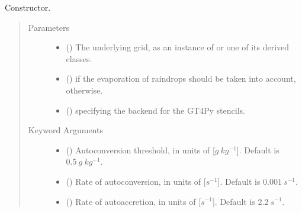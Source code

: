 \documentclass[letterpaper,10pt,english]{sphinxmanual}
\begin{document}
\begin{fulllineitems}
\begin{fulllineitems}
\label{\detokenize{api:parameterizations.adjustment_microphysics_kessler_wrf.AdjustmentMicrophysicsKesslerWRF.__init__}}
Constructor.
\begin{quote}\begin{description}
\item[{Parameters}] \leavevmode\begin{itemize}
\item {} 
 () \textendash{} The underlying grid, as an instance of {\hyperref[\detokenize{api:grids.grid_xyz.GridXYZ}]{}} or one of its derived classes.

\item {} 
 () \textendash{}  if the evaporation of raindrops should be taken into account,  otherwise.

\item {} 
 () \textendash{}  specifying the backend for the GT4Py stencils.

\end{itemize}

\item[{Keyword Arguments}] \leavevmode\begin{itemize}
\item {} 
 () \textendash{} Autoconversion threshold, in units of {[}\(g ~ kg^{-1}\){]}. Default is \(0.5 ~ g ~ kg^{-1}\).

\item {} 
 () \textendash{} Rate of autoconversion, in units of {[}\(s^{-1}\){]}. Default is \(0.001 ~ s^{-1}\).

\item {} 
 () \textendash{} Rate of autoaccretion, in units of {[}\(s^{-1}\){]}. Default is \(2.2 ~ s^{-1}\).

\end{itemize}

\end{description}\end{quote}


\end{fulllineitems}
\end{fulllineitems}
\end{document}
